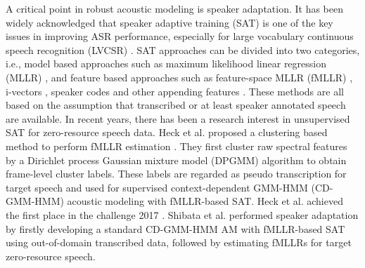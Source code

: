 \documentclass[a4paper]{article}
\begin{document}
A critical point in robust acoustic modeling is speaker adaptation.
It has been widely acknowledged that speaker adaptive training (SAT) is one of the key issues in improving ASR performance, especially for large vocabulary continuous speech recognition (LVCSR) \cite{anastasakos1997speaker,miao2015speaker,Cui2017}. SAT approaches can be divided into two  categories, i.e., model based approaches such as maximum likelihood linear regression (MLLR) \cite{gales1998maximum}, and feature based approaches such as feature-space MLLR (fMLLR) \cite{li2010comparison}, i-vectors \cite{saon2013speaker}, speaker codes \cite{xue2014fast} 
and other appending features \cite{seltzer2013investigation,Xie2017}. 
These methods are all based on the assumption that transcribed or at least speaker annotated speech are available. In recent years, there has been a research interest in unsupervised  SAT for zero-resource speech data.
Heck et al.  proposed a clustering based method to perform fMLLR estimation \cite{heck2017feature}. They first cluster raw spectral features by a Dirichlet process Gaussian mixture model (DPGMM) algorithm \cite{chang2013parallel,chen2015parallel} to obtain frame-level cluster labels. These labels are regarded as pseudo transcription for target speech and used for supervised context-dependent GMM-HMM (CD-GMM-HMM) acoustic modeling with fMLLR-based SAT. Heck et al. \cite{heck2017feature} achieved the first place in the challenge 2017 \cite{dunbar2017zero}.
Shibata et al. \cite{shibata2017composite} performed speaker adaptation by firstly developing a standard CD-GMM-HMM AM with fMLLR-based SAT using out-of-domain transcribed data, followed by estimating fMLLRs for target zero-resource speech. 
\end{document}
